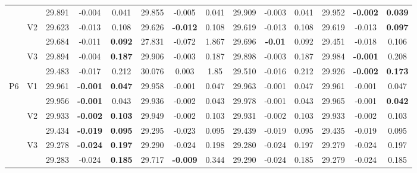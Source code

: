 \documentclass[12pt,a4paper]{article}
\begin{document}
\begin{sidewaystable}[ht]
{\begin{tabular}{cc|ccc|ccc|ccc|ccc|}
   &  & 29.891 & -0.004 & 0.041 & 29.855 & -0.005 & 0.041 & 29.909 & -0.003 & 0.041 & 29.952 & \textbf{-0.002} & \textbf{0.039} \\ 
   & \multirow{2}{*}{V2} & 29.623 & -0.013 & 0.108 & 29.626 & \textbf{-0.012} & 0.108 & 29.619 & -0.013 & 0.108 & 29.619 & -0.013 & \textbf{0.097} \\ 
   &  & 29.684 & -0.011 & \textbf{0.092} & 27.831 & -0.072 & 1.867 & 29.696 & \textbf{-0.01} & 0.092 & 29.451 & -0.018 & 0.106 \\ 
   & \multirow{2}{*}{V3} & 29.894 & -0.004 & \textbf{0.187} & 29.906 & -0.003 & 0.187 & 29.898 & -0.003 & 0.187 & 29.984 & \textbf{-0.001} & 0.208 \\ 
   &  & 29.483 & -0.017 & 0.212 & 30.076 & 0.003 & 1.85 & 29.510 & -0.016 & 0.212 & 29.926 & \textbf{-0.002} & \textbf{0.173} \\ 
   \hline \hline\multirow{6}{*}{P6} & \multirow{2}{*}{V1} & 29.961 & \textbf{-0.001} & \textbf{0.047} & 29.958 & -0.001 & 0.047 & 29.963 & -0.001 & 0.047 & 29.961 & -0.001 & 0.047 \\ 
   &  & 29.956 & \textbf{-0.001} & 0.043 & 29.936 & -0.002 & 0.043 & 29.978 & -0.001 & 0.043 & 29.965 & -0.001 & \textbf{0.042} \\ 
   & \multirow{2}{*}{V2} & 29.933 & \textbf{-0.002} & \textbf{0.103} & 29.949 & -0.002 & 0.103 & 29.931 & -0.002 & 0.103 & 29.933 & -0.002 & 0.103 \\ 
   &  & 29.434 & \textbf{-0.019} & \textbf{0.095} & 29.295 & -0.023 & 0.095 & 29.439 & -0.019 & 0.095 & 29.435 & -0.019 & 0.095 \\ 
   & \multirow{2}{*}{V3} & 29.278 & \textbf{-0.024} & \textbf{0.197} & 29.290 & -0.024 & 0.198 & 29.280 & -0.024 & 0.197 & 29.279 & -0.024 & 0.197 \\ 
   &  & 29.283 & -0.024 & \textbf{0.185} & 29.717 & \textbf{-0.009} & 0.344 & 29.290 & -0.024 & 0.185 & 29.279 & -0.024 & 0.185 \\ 
   \hline
\end{tabular}
}
\end{sidewaystable}
\end{document}
